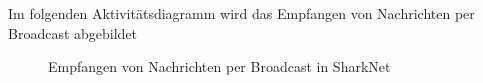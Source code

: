\documentclass[german, 12pt]{book}
\begin{document}
Im folgenden Aktivitätsdiagramm wird das Empfangen von Nachrichten per Broadcast abgebildet
\begin{figure}[H]
	\centering
	\hspace*{1cm}
	\caption{Empfangen von Nachrichten per Broadcast in SharkNet}
	\label{fig:broadcastReceive}
\end{figure}

\newpage
\end{document}
